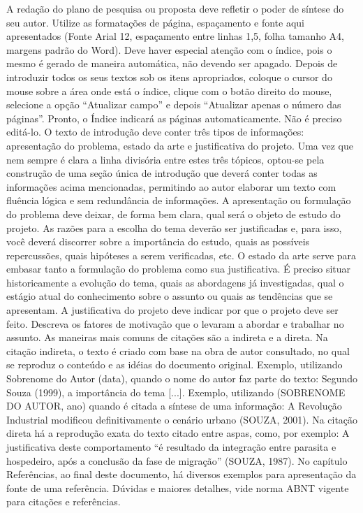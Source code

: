 A redação do plano de pesquisa ou proposta deve refletir o poder de síntese do seu autor. Utilize as formatações de página, espaçamento e fonte aqui apresentados (Fonte Arial 12, espaçamento entre linhas 1,5, folha tamanho A4, margens padrão do Word). 
Deve haver especial atenção com o índice, pois o mesmo é gerado de maneira automática, não devendo ser apagado. Depois de introduzir todos os seus textos sob os itens apropriados, coloque o cursor do mouse sobre a área onde está o índice, clique com o botão direito do mouse, selecione a opção “Atualizar campo” e depois “Atualizar apenas o número das páginas”. Pronto, o Índice indicará as páginas automaticamente. Não é preciso editá-lo. 
O texto de introdução deve conter três tipos de informações: apresentação do problema, estado da arte e justificativa do projeto. Uma vez que nem sempre é clara a linha divisória entre estes três tópicos, optou-se pela construção de uma seção única de introdução que deverá conter todas as informações acima mencionadas, permitindo ao autor elaborar um texto com fluência lógica e sem redundância de informações.
A apresentação ou formulação do problema deve deixar, de forma bem clara, qual será o objeto de estudo do projeto. As razões para a escolha do tema deverão ser justificadas e, para isso, você deverá discorrer sobre a importância do estudo, quais as possíveis repercussões, quais hipóteses a serem verificadas, etc. 
O estado da arte serve para embasar tanto a formulação do problema como sua justificativa. É preciso situar historicamente a evolução do tema, quais as abordagens já investigadas, qual o estágio atual do conhecimento sobre o assunto ou quais as tendências que se apresentam.
A justificativa do projeto deve indicar por que o projeto deve ser feito. Descreva os fatores de motivação que o levaram a abordar e trabalhar no assunto.
As maneiras mais comuns de citações são a indireta e a direta. Na citação indireta, o texto é criado com base na obra de autor consultado, no qual se reproduz o conteúdo e as idéias do documento original. Exemplo, utilizando Sobrenome do Autor (data), quando o nome do autor faz parte do texto: Segundo Souza (1999), a importância do tema [...]. Exemplo, utilizando (SOBRENOME DO AUTOR, ano) quando é citada a síntese de uma informação: A Revolução Industrial modificou definitivamente o cenário urbano (SOUZA, 2001). Na citação direta há a reprodução exata do texto citado entre aspas, como, por exemplo: A justificativa deste comportamento “é resultado da integração entre parasita e hospedeiro, após a conclusão da fase de migração” (SOUZA, 1987). No capítulo Referências, ao final deste documento, há diversos exemplos para apresentação da fonte de uma referência. Dúvidas e maiores detalhes, vide norma ABNT vigente para citações e referências.
